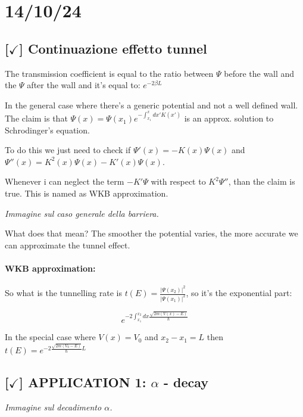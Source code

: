 \section{14/10/24}

\subsection{[$\checkmark$] Continuazione effetto tunnel}

The transmission coefficient is equal to the ratio between $\Psi$ before the wall and the $\Psi$ after the wall and it's equal to: $e^{-2\beta L}$

\vspace{10pt}

\noindent In the general case where there's a generic potential and not a well defined wall. The claim is that $\Psi(x) = \Psi(x_1) e^{-\int_{x_1}^{x}dx'K(x')}$ is an approx. solution to Schrodinger's equation.

To do this we just need to check if $\Psi'(x) = -K(x)\Psi(x)$ and $\Psi''(x) = K^2(x)\Psi(x) - K'(x)\Psi(x)$.

Whenever i can neglect the term $-K'\Psi$ with respect to $K^2\Psi''$, than the claim is true. This is named as WKB approximation.

\vspace{10pt}
\textit{Immagine sul caso generale della barriera.}
\vspace{10pt}

What does that mean? The smoother the potential varies, the more accurate we can approximate the tunnel effect.

\paragraph{WKB approximation:} So what is the tunnelling rate is $t(E) = \frac{|\Psi(x_2)|^2}{|\Psi(x_1)|^2}$, so it's the exponential part: 

$$e^{-2 \int_{x_1}^{x_2} dx \frac{\sqrt{2m(V(x) - E)}}  {\hbar}   }$$

In the special case where $V(x) = V_0$ and $x_2-x_1=L$ then $t(E) = e^{-2 \frac{\sqrt{2m(V_0 -E)}}{\hbar}L}$

\subsection{[$\checkmark$] APPLICATION 1: $\alpha$ - decay}

\vspace{10pt}
\textit{Immagine sul decadimento $\alpha$.}
\vspace{10pt}

